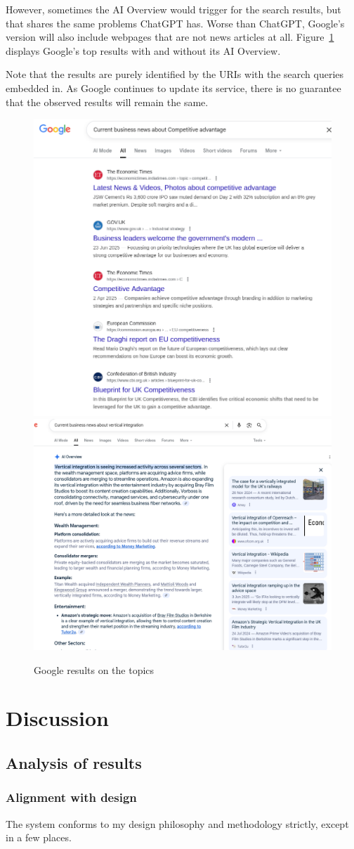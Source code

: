 \documentclass[final-report]{report-template}
\begin{document}
However, sometimes the AI Overview would trigger for the search results, but
that shares the same problems ChatGPT has. Worse than ChatGPT, Google's version
will also include webpages that are not news articles at all.
Figure~\ref{fig.results.google} displays Google's top results with and without
its AI Overview.

Note that the results are purely identified by the URIs with the search queries
embedded in. As Google continues to update its service, there is no guarantee
that the observed results will remain the same.

\begin{figure}[hbtp!]
	\centering
	\includegraphics[width=.3\textwidth]{res/google_res1.png}
	\includegraphics[width=.5\textwidth]{res/google_res2.png}
	\caption{Google results on the topics}
	\label{fig.results.google}
\end{figure}


\section{Discussion}
\subsection{Analysis of results}
\subsubsection{Alignment with design}
The system conforms to my design philosophy and methodology strictly, except
in a few places. 
\end{document}
